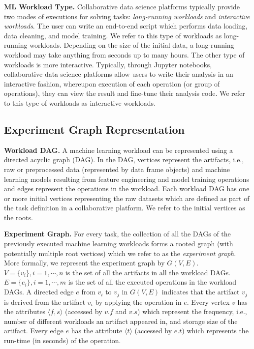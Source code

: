 {\textbf{ML Workload Type.}
Collaborative data science platforms typically provide two modes of executions for solving tasks:
\textit{long-running workloads} and \textit{interactive workloads}.
The user can write an end-to-end script which performs data loading, data cleaning, and model training. We refer to this type of workloads as long-running workloads.
Depending on the size of the initial data, a long-running workload may take anything from seconds up to many hours.
The other type of workloads is more interactive.
Typically, through Jupyter notebooks, collaborative data science platforms allow users to write their analysis in an interactive fashion, whereupon execution of each operation (or group of operations), they can view the result and fine-tune their analysis code.
We refer to this type of workloads as interactive workloads.
}

\subsection{Experiment Graph Representation}\label{sub-graph-construction}
\textbf{Workload DAG.}
A machine learning workload can be represented using a directed acyclic graph (DAG).
In the DAG, vertices represent the artifacts, i.e., raw or preprocessed data (represented by data frame objects) and machine learning models resulting from feature engineering and model training operations and edges represent the operations in the workload.
Each workload DAG has one or more initial vertices representing the raw datasets which are defined as part of the task definition in a collaborative platform.
We refer to the initial vertices as the roots.

\textbf{Experiment Graph. }
For every task, the collection of all the DAGs of the previously executed machine learning workloads forms a rooted graph (with potentially multiple root vertices) which we refer to as the \textit{experiment graph}.
More formally, we represent the experiment graph by $G(V, E)$.
$V=\{v_i\}, i = 1, \cdots, n$ is the set of all the artifacts in all the workload DAGs.
$E=\{e_i\}, i = 1, \cdots, m$ is the set of all the executed operations in the workload DAGs.
A directed edge $e$ from $v_i$ to $v_j$ in $G(V, E)$ indicates that the artifact $v_j$ is derived from the artifact $v_i$ by applying the operation in $e$.
Every vertex $v$ has the attributes $\langle f, s \rangle$ (accessed by $v.f$ and $v.s$) which represent the frequency, i.e., number of different workloads an artifact appeared in, and storage size of the artifact.
Every edge $e$ has the attribute $\langle t \rangle$ (accessed by $e.t$) which represents the run-time (in seconds) of the operation.


